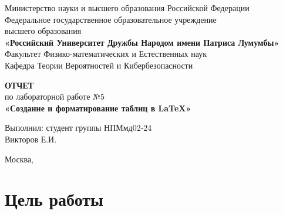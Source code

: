 \documentclass[12pt,a4paper]{article}
\begin{document}
\begin{titlepage}
    \centering
    \vspace*{2cm}
    
    {\Large Министерство науки и высшего образования Российской Федерации\\}
    \vspace{0.5cm}
    {\Large Федеральное государственное образовательное учреждение\\}
    {\Large высшего образования\\}
    \vspace{0.5cm}
    {\Large\bfseries «Российский Университет Дружбы Народом имени Патриса Лумумбы»\\}
    \vspace{1cm}
    {\large Факультет Физико-математических и Естественных наук\\}
    {\large Кафедра Теории Вероятностей и Кибербезопасности\\}
    
    \vspace{3cm}
    
    {\LARGE\bfseries ОТЧЕТ\\}
    \vspace{0.5cm}
    {\Large по лабораторной работе №5\\}
    \vspace{0.5cm}
    {\Large\bfseries «Создание и форматирование таблиц в LaTeX»\\}
    
    \vfill
    
    \begin{flushright}
        Выполнил: студент группы НПМмд02-24\\
        Викторов Е.И.\\
        \vspace{0.5cm}
    \end{flushright}
    
    \vspace{1cm}
    
    {\large Москва, \the\year}
    
\end{titlepage}

\tableofcontents
\newpage

\section{Цель работы}
\end{document}
